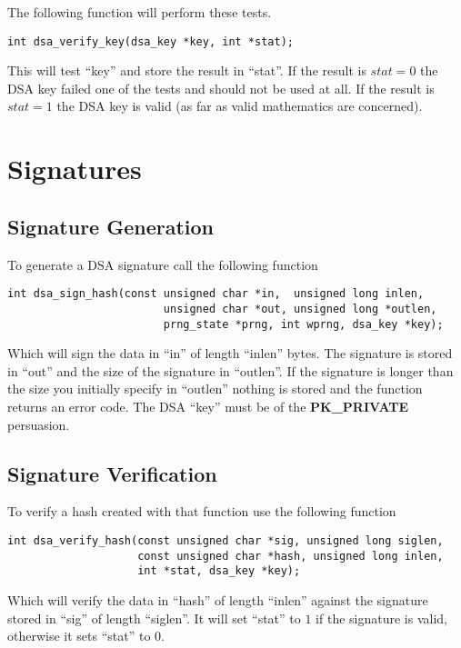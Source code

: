 \documentclass[a4paper]{book}
\begin{document}
The following function will perform these tests.

\begin{verbatim}
int dsa_verify_key(dsa_key *key, int *stat);
\end{verbatim}

This will test ``key'' and store the result in ``stat''.  If the result is $stat = 0$ the DSA key failed one of the tests
and should not be used at all.  If the result is $stat = 1$ the DSA key is valid (as far as valid mathematics are concerned).

\section{Signatures}
\subsection{Signature Generation}
To generate a DSA signature call the following function

\begin{verbatim}
int dsa_sign_hash(const unsigned char *in,  unsigned long inlen,
                        unsigned char *out, unsigned long *outlen,
                        prng_state *prng, int wprng, dsa_key *key);
\end{verbatim}

Which will sign the data in ``in'' of length ``inlen'' bytes.  The signature is stored in ``out'' and the size
of the signature in ``outlen''.  If the signature is longer than the size you initially specify in ``outlen'' nothing
is stored and the function returns an error code.  The DSA ``key'' must be of the \textbf{PK\_PRIVATE} persuasion.

\subsection{Signature Verification}
To verify a hash created with that function use the following function

\begin{verbatim}
int dsa_verify_hash(const unsigned char *sig, unsigned long siglen,
                    const unsigned char *hash, unsigned long inlen, 
                    int *stat, dsa_key *key);
\end{verbatim}
Which will verify the data in ``hash'' of length ``inlen'' against the signature stored in ``sig'' of length ``siglen''.  
It will set ``stat'' to $1$ if the signature is valid, otherwise it sets ``stat'' to $0$.  
\end{document}
